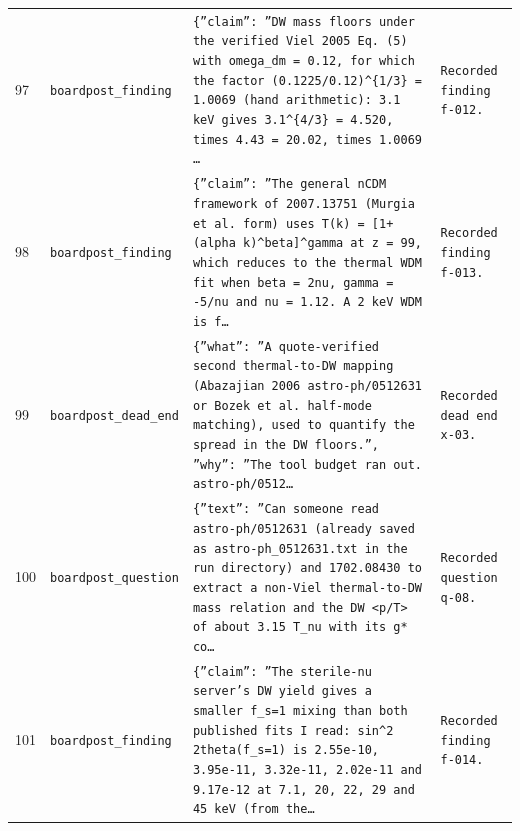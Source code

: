 \documentclass[11pt,a4paper]{article}
\begin{document}
\begin{longtable}{@{}p{}p{}p{}p{}@{}}
97 & \texttt{board}\newline\texttt{post\_\allowbreak{}finding} & \texttt{\{''claim'':\allowbreak{} ''DW mass floors under the verified Viel 2005 Eq. (5)\allowbreak{} with omega\_\allowbreak{}dm =\allowbreak{} 0.12,\allowbreak{} for which the factor (0.1225/\allowbreak{}0.12)\allowbreak{}\textasciicircum{}\allowbreak{}\{1/\allowbreak{}3\}\allowbreak{} =\allowbreak{} 1.0069 (hand arithmetic)\allowbreak{}:\allowbreak{} 3.1 keV gives 3.1\textasciicircum{}\allowbreak{}\{4/\allowbreak{}3\}\allowbreak{} =\allowbreak{} 4.520,\allowbreak{} times 4.43 =\allowbreak{} 20.02,\allowbreak{} times 1.0069 \ldots{}\allowbreak{}} & \texttt{Recorded finding f-012.} \\
98 & \texttt{board}\newline\texttt{post\_\allowbreak{}finding} & \texttt{\{''claim'':\allowbreak{} ''The general nCDM framework of 2007.13751 (Murgia et al. form)\allowbreak{} uses T(k)\allowbreak{} =\allowbreak{} [1+(alpha k)\allowbreak{}\textasciicircum{}\allowbreak{}beta]\allowbreak{}\textasciicircum{}\allowbreak{}gamma at z =\allowbreak{} 99,\allowbreak{} which reduces to the thermal WDM fit when beta =\allowbreak{} 2nu,\allowbreak{} gamma =\allowbreak{} -5/\allowbreak{}nu and nu =\allowbreak{} 1.12. A 2 keV WDM is f\ldots{}\allowbreak{}} & \texttt{Recorded finding f-013.} \\
99 & \texttt{board}\newline\texttt{post\_\allowbreak{}dead\_\allowbreak{}end} & \texttt{\{''what'':\allowbreak{} ''A quote-verified second thermal-to-DW mapping (Abazajian 2006 astro-ph/\allowbreak{}0512631 or Bozek et al. half-mode matching)\allowbreak{},\allowbreak{} used to quantify the spread in the DW floors.'',\allowbreak{} ''why'':\allowbreak{} ''The tool budget ran out. astro-ph/\allowbreak{}0512\ldots{}\allowbreak{}} & \texttt{Recorded dead end x-03.} \\
100 & \texttt{board}\newline\texttt{post\_\allowbreak{}question} & \texttt{\{''text'':\allowbreak{} ''Can someone read astro-ph/\allowbreak{}0512631 (already saved as astro-ph\_\allowbreak{}0512631.txt in the run directory)\allowbreak{} and 1702.08430 to extract a non-Viel thermal-to-DW mass relation and the DW \textless{}\allowbreak{}p/\allowbreak{}T\textgreater{}\allowbreak{} of about 3.15 T\_\allowbreak{}nu with its g* co\ldots{}\allowbreak{}} & \texttt{Recorded question q-08.} \\
101 & \texttt{board}\newline\texttt{post\_\allowbreak{}finding} & \texttt{\{''claim'':\allowbreak{} ''The sterile-nu server's DW yield gives a smaller f\_\allowbreak{}s=\allowbreak{}1 mixing than both published fits I read:\allowbreak{} sin\textasciicircum{}\allowbreak{}2 2theta(f\_\allowbreak{}s=\allowbreak{}1)\allowbreak{} is 2.55e-10,\allowbreak{} 3.95e-11,\allowbreak{} 3.32e-11,\allowbreak{} 2.02e-11 and 9.17e-12 at 7.1,\allowbreak{} 20,\allowbreak{} 22,\allowbreak{} 29 and 45 keV (from the\ldots{}\allowbreak{}} & \texttt{Recorded finding f-014.} \\

\end{longtable}
\end{document}
